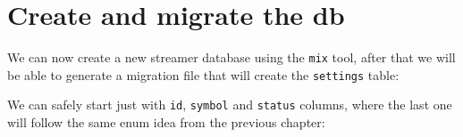 \documentclass[
  oneside]{book}
\newenvironment{Shaded}{\begin{snugshade}}{\end{snugshade}}
\newcommand{\AttributeTok}[1]{\textcolor[rgb]{0.13,0.29,0.53}{#1}}
\newcommand{\ExtensionTok}[1]{#1}
\newcommand{\NormalTok}[1]{#1}
\begin{document}
\section{Create and migrate the db}\label{create-and-migrate-the-db-1}

We can now create a new streamer database using the \texttt{mix} tool, after that we will be able to generate a migration file that will create the \texttt{settings} table:

\begin{Shaded}
\end{Shaded}

We can safely start just with \texttt{id}, \texttt{symbol} and \texttt{status} columns, where the last one will follow the same enum idea from the previous chapter:
\end{document}
